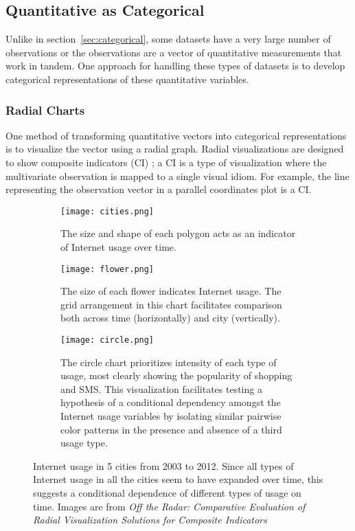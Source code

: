 \documentclass[../main.tex]{subfiles}
\begin{document}
\subsection{Quantitative as Categorical}

Unlike in section~\ref{sec:categorical}, some datasets have a very large number of observations or the observations are a vector of quantitative measurements that work in tandem. One approach for handling these types of datasets is to develop categorical representations of these quantitative variables.  



\subsubsection{Radial Charts}
\label{sec:radial}
One method of transforming quantitative vectors into categorical representations is to visualize the vector using a radial graph. Radial visualizations are designed to show composite indicators (CI) \cite{chambers_graphical_1983}; a CI is a type of visualization where the multivariate observation is mapped to a single visual idiom. For example, the line representing the observation vector in a parallel coordinates plot is a CI. 
\begin{figure}[H]
    \begin{subfigure}{\textwidth}
    \centering
    \texttt{[image: cities.png]}
    \caption{The size and shape of each polygon acts as an indicator of Internet usage over time.}
    \label{fig:radarchart}
    \end{subfigure}

    \bigskip
    \begin{subfigure}{\textwidth}
    \centering
    \texttt{[image: flower.png]}
    \caption{The size of each flower indicates Internet usage. The grid arrangement in this chart facilitates comparison both across time (horizontally) and city (vertically).}
    \label{fig:flowerchart}
    \end{subfigure}

    \bigskip
    \begin{subfigure}{\textwidth}
    \centering
    \texttt{[image: circle.png]}
    \caption{The circle chart prioritizes intensity of each type of usage, most clearly showing the popularity of shopping and SMS. This visualization facilitates testing a hypothesis of a conditional dependency amongst the Internet usage variables by isolating similar pairwise color patterns in the presence and absence of a third usage type.}
    \label{fig:circlechart}
    \end{subfigure}
\caption{Internet usage in 5 cities from 2003 to 2012. Since all types of Internet usage in all the cities seem to have expanded over time, this suggests a conditional dependence of different types of usage on time. Images are from \textit{Off the Radar: Comparative Evaluation of Radial Visualization Solutions for Composite Indicators} \cite{albo_off_2016}}
\label{fig:radial}
\end{figure}
\end{document}
